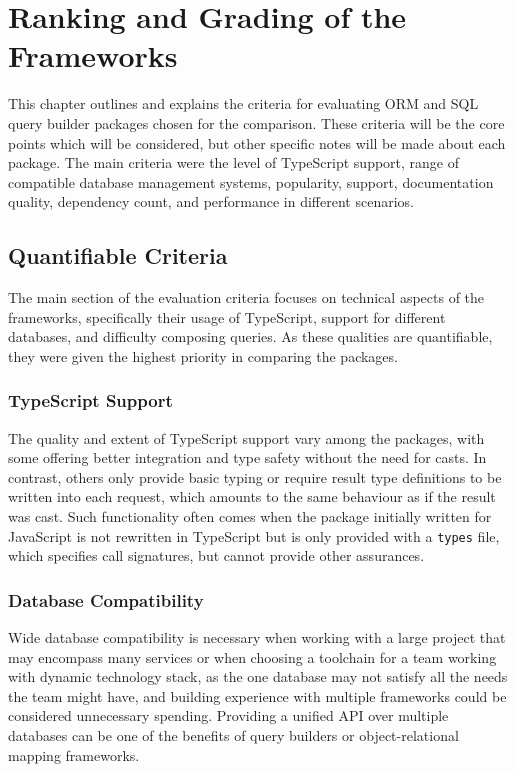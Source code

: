 \chapter{Ranking and Grading of the Frameworks}

This chapter outlines and explains the criteria for evaluating ORM and SQL query
builder packages chosen for the comparison. These criteria will be the core
points which will be considered, but other specific notes will be made about
each package. The main criteria were the level of TypeScript support, range of
compatible database management systems, popularity, support, documentation
quality, dependency count, and performance in different scenarios.

\section{Quantifiable Criteria}

The main section of the evaluation criteria focuses on technical aspects of the
frameworks, specifically their usage of TypeScript, support for different
databases, and difficulty composing queries. As these qualities are
quantifiable, they were given the highest priority in comparing the packages.

\subsection{TypeScript Support}

The quality and extent of TypeScript support vary among the packages, with some
offering better integration and type safety without the need for casts. In
contrast, others only provide basic typing or require result type definitions to
be written into each request, which amounts to the same behaviour as if the
result was cast. Such functionality often comes when the package initially
written for JavaScript is not rewritten in TypeScript but is only provided with
a \texttt{types} file, which specifies call signatures, but cannot provide other
assurances.

\subsection{Database Compatibility}

Wide database compatibility is necessary when working with a large project that
may encompass many services or when choosing a toolchain for a team working with
dynamic technology stack, as the one database may not satisfy all the needs the
team might have, and building experience with multiple frameworks could be
considered unnecessary spending. Providing a unified API over multiple databases
can be one of the benefits of query builders or object-relational mapping
frameworks.

